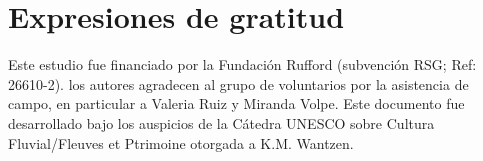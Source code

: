 \section*{Expresiones de gratitud}

Este estudio fue financiado por la Fundación Rufford (subvención RSG; Ref: 26610-2). los autores agradecen al grupo de voluntarios por la asistencia de campo, en particular a Valeria Ruiz y Miranda Volpe. Este documento fue desarrollado bajo los auspicios de la Cátedra UNESCO sobre Cultura Fluvial/Fleuves et Ptrimoine otorgada a K.M. Wantzen.
